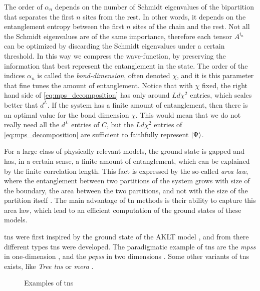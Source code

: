 The order of $\alpha_n$ depends on the number of Schmidt eigenvalues of the bipartition that separates the first $n$ sites from the rest.
In other words, it depends on the entanglement entropy between the first $n$ sites of the chain and the rest.
Not all the Schmidt eigenvalues are of the same importance, therefore each tensor $A^{i_n}$ can be optimized by discarding the Schmidt eigenvalues under a certain threshold.
In this way we compress the wave-function, by preserving the information that best represent the entanglement in the state.
The order of the indices $\alpha_n$ is called the \emph{bond-dimension}, often denoted $\chi$, and it is this parameter that fine tunes the amount of entanglement.
Notice that with $\chi$ fixed, the right hand side of \eqref{eq:mps_decomposition} has only around $L d \chi^2$ entries, which scales better that $d^L$.
If the system has a finite amount of entanglement, then there is an optimal value for the bond dimension $\chi$.
This would mean that we do not really need all the $d^L$ entries of $C$, but the $L d \chi^2$ entries of \eqref{eq:mps_decomposition} are sufficient to faithfully represent $\ket{\Psi}$.

For a large class of physically relevant models, the ground state is gapped and has, in a certain sense, a finite amount of entanglement, which can be explained by the finite correlation length.
This fact is expressed by the so-called \emph{area law}, where the entanglement between two partitions of the system grows with size of the boundary, the area between the two partitions, and not with the size of the partition itself \cite{vidal2003arealaw, calabrese2004qft, srednicki1993area, plenio2005area}.
The main advantage of \ac{tn} methods is their ability to capture this area law, which lead to an efficient computation of the ground states of these models.

\Acp{tn} were first inspired by the ground state of the AKLT model \cite{affleck1987aklt}, and from there different types \acp{tn} were developed.
The paradigmatic example of \acp{tn} are the \emph{\acp{mps}} in one-dimension \cite{vidal2008simulation, schollwock2011dmrg}, and the \emph{\acp{peps}} in two dimensions \cite{verstraete2004algo, jordan2008ipeps}.
Some other variants of \acp{tn} exists, like \emph{Tree \acp{tn}} \cite{tagliacozzo2009tree, fannes1992trees} or \emph{\ac{mera}} \cite{evenbly2013mera, vidal2007entanglement, evenbly2009entanglement}.

\begin{figure}[t]
    \centering
    
    \caption{Examples of \acp{tn}}
\end{figure}

